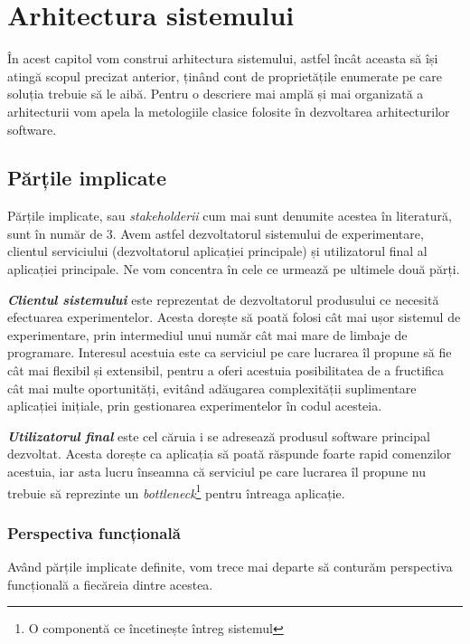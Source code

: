 \chapter{Arhitectura sistemului}

În acest capitol vom construi arhitectura sistemului, astfel încât aceasta să își atingă scopul precizat anterior, ținând cont de proprietățile enumerate pe care soluția trebuie să le aibă. Pentru o descriere mai amplă și mai organizată a arhitecturii vom apela la metologiile clasice folosite în dezvoltarea arhitecturilor software.

\section{Părțile implicate}

Părțile implicate, sau \textit{stakeholderii} cum mai sunt denumite acestea în literatură, sunt în număr de 3. Avem astfel dezvoltatorul sistemului de experimentare, clientul serviciului (dezvoltatorul aplicației principale) și utilizatorul final al aplicației principale. Ne vom concentra în cele ce urmează pe ultimele două părți.

\textbf{\textit{Clientul sistemului}} este reprezentat de dezvoltatorul produsului ce necesită efectuarea experimentelor. Acesta dorește să poată folosi cât mai ușor sistemul de experimentare, prin intermediul unui număr cât mai mare de limbaje de programare. Interesul acestuia este ca serviciul pe care lucrarea îl propune să fie cât mai flexibil și extensibil, pentru a oferi acestuia posibilitatea de a fructifica cât mai multe oportunități, evitând adăugarea complexității suplimentare aplicației inițiale, prin gestionarea experimentelor în codul acesteia.

\textbf{\textit{Utilizatorul final}} este cel căruia i se adresează produsul software principal dezvoltat. Acesta dorește ca aplicația să poată răspunde foarte rapid comenzilor acestuia, iar asta lucru înseamna că serviciul pe care lucrarea îl propune nu trebuie să reprezinte un \textit{bottleneck}\footnote{O componentă ce încetinește întreg sistemul} pentru întreaga aplicație.

\subsection{Perspectiva funcțională}

Având părțile implicate definite, vom trece mai departe să conturăm perspectiva funcțională a fiecăreia dintre acestea.

